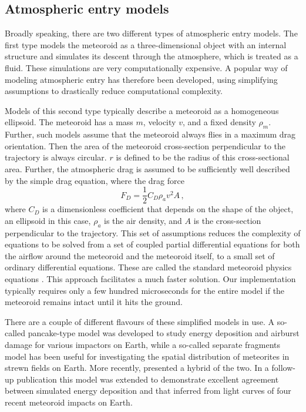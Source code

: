 \subsection{Atmospheric entry models}

Broadly speaking, there are two different types of atmospheric entry models.
The first type models the meteoroid as a three-dimensional object with an internal structure and simulates its descent through the atmosphere, which is treated as a fluid.
These simulations are very computationally expensive.
A popular way of modeling atmospheric entry has therefore been developed, using simplifying assumptions to drastically reduce computational complexity.

Models of this second type typically describe a meteoroid as a homogeneous ellipsoid. The meteoroid has a mass $m$, velocity $v$, and a fixed density $\rho_m$. Further, such models assume that the meteoroid always flies in a maximum drag orientation. Then the area of the meteoroid cross-section perpendicular to the trajectory is always circular. $r$ is defined to be the radius of this cross-sectional area. Further, the atmospheric drag is assumed to be sufficiently well described by the simple drag equation, where the drag force
\begin{equation*}
    F_D = \frac{1}{2}C_D \rho_a v^2 A\,,
\end{equation*}
where $C_D$ is a dimensionless coefficient that depends on the shape of the object, an ellipsoid in this case, $\rho_a$ is the air density, and $A$ is the cross-section perpendicular to the trajectory.
This set of assumptions reduces the complexity of equations to be solved from a set of coupled partial differential equations for both the airflow around the meteoroid and the meteoroid itself, to a small set of ordinary differential equations.
These are called the standard meteoroid physics equations \citep[e.g.,][]{passey1980effects}.
This approach facilitates a much faster solution. Our implementation typically requires only a few hundred microseconds for the entire model if the meteoroid remains intact until it hits the ground.

There are a couple of different flavours of these simplified models in use. A so-called pancake-type model \citep{hills1993fragmentation} was developed to study energy deposition and airburst damage for various impactors on Earth, while a so-called separate fragments model \citep{passey1980effects} has been useful for investigating the spatial distribution of meteorites in strewn fields on Earth. More recently, \cite{wheeler2017fragmentcloud} presented a hybrid of the two. In a follow-up publication \citep{wheeler2018atmospheric} this model was extended to demonstrate excellent agreement between simulated energy deposition and that inferred from light curves of four recent meteoroid impacts on Earth.

